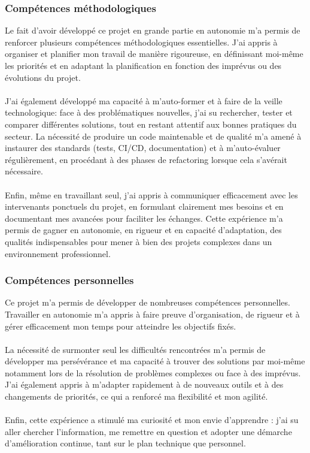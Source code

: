 \documentclass[12pt]{article}
\begin{document}
\subsubsection{Compétences méthodologiques}
Le fait d’avoir développé ce projet en grande partie en autonomie m’a permis de renforcer plusieurs compétences méthodologiques essentielles. J’ai appris à organiser et planifier mon travail de manière rigoureuse, en définissant moi-même les priorités et en adaptant la planification en fonction des imprévus ou des évolutions du projet.
\\\\
J’ai également développé ma capacité à m’auto-former et à faire de la veille technologique: face à des problématiques nouvelles, j’ai su rechercher, tester et comparer différentes solutions, tout en restant attentif aux bonnes pratiques du secteur. La nécessité de produire un code maintenable et de qualité m’a amené à instaurer des standards (tests, CI/CD, documentation) et à m’auto-évaluer régulièrement, en procédant à des phases de refactoring lorsque cela s’avérait nécessaire.
\\\\
Enfin, même en travaillant seul, j’ai appris à communiquer efficacement avec les intervenants ponctuels du projet, en formulant clairement mes besoins et en documentant mes avancées pour faciliter les échanges. Cette expérience m’a permis de gagner en autonomie, en rigueur et en capacité d’adaptation, des qualités indispensables pour mener à bien des projets complexes dans un environnement professionnel.
\subsubsection{Compétences personnelles}
Ce projet m’a permis de développer de nombreuses compétences personnelles. Travailler en autonomie m’a appris à faire preuve d’organisation, de rigueur et à gérer efficacement mon temps pour atteindre les objectifs fixés. 
\\\\
La nécessité de surmonter seul les difficultés rencontrées m’a permis de développer ma persévérance et ma capacité à trouver des solutions par moi-même notamment lors de la résolution de problèmes complexes ou face à des imprévus. J’ai également appris à m’adapter rapidement à de nouveaux outils et à des changements de priorités, ce qui a renforcé ma flexibilité et mon agilité.
\\\\
Enfin, cette expérience a stimulé ma curiosité et mon envie d’apprendre : j’ai su aller chercher l’information, me remettre en question et adopter une démarche d’amélioration continue, tant sur le plan technique que personnel.
\newpage
\end{document}
